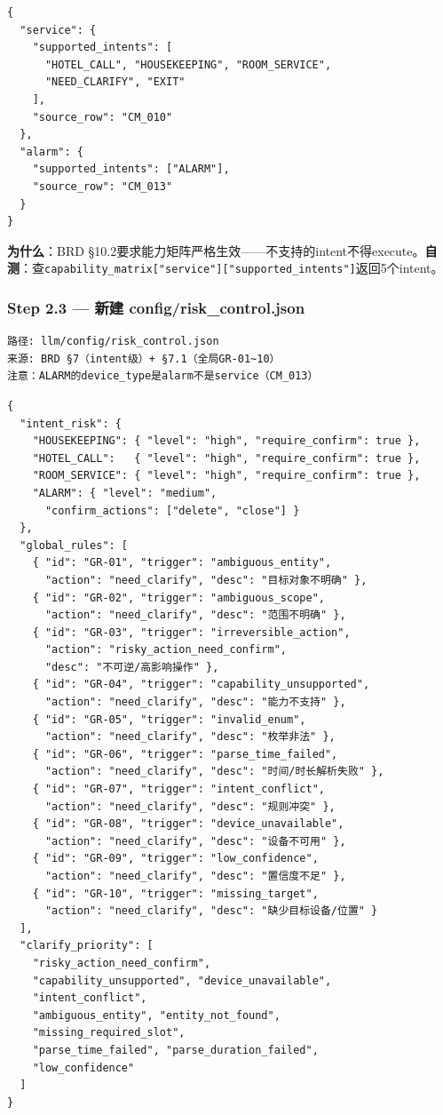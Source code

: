 \documentclass[12pt,a4paper]{ctexart}
\begin{document}
{\small
\begin{verbatim}
{
  "service": {
    "supported_intents": [
      "HOTEL_CALL", "HOUSEKEEPING", "ROOM_SERVICE",
      "NEED_CLARIFY", "EXIT"
    ],
    "source_row": "CM_010"
  },
  "alarm": {
    "supported_intents": ["ALARM"],
    "source_row": "CM_013"
  }
}
\end{verbatim}
}

\textbf{为什么}：BRD §10.2要求能力矩阵严格生效——不支持的intent不得execute。\textbf{自测}：查\texttt{capability\_matrix["service"]["supported\_intents"]}返回5个intent。

\subsubsection*{Step 2.3 — 新建 config/risk\_control.json}
\begin{verbatim}
路径: llm/config/risk_control.json
来源: BRD §7（intent级）+ §7.1（全局GR-01~10）
注意：ALARM的device_type是alarm不是service（CM_013）
\end{verbatim}

{\small
\begin{verbatim}
{
  "intent_risk": {
    "HOUSEKEEPING": { "level": "high", "require_confirm": true },
    "HOTEL_CALL":   { "level": "high", "require_confirm": true },
    "ROOM_SERVICE": { "level": "high", "require_confirm": true },
    "ALARM": { "level": "medium",
      "confirm_actions": ["delete", "close"] }
  },
  "global_rules": [
    { "id": "GR-01", "trigger": "ambiguous_entity",
      "action": "need_clarify", "desc": "目标对象不明确" },
    { "id": "GR-02", "trigger": "ambiguous_scope",
      "action": "need_clarify", "desc": "范围不明确" },
    { "id": "GR-03", "trigger": "irreversible_action",
      "action": "risky_action_need_confirm",
      "desc": "不可逆/高影响操作" },
    { "id": "GR-04", "trigger": "capability_unsupported",
      "action": "need_clarify", "desc": "能力不支持" },
    { "id": "GR-05", "trigger": "invalid_enum",
      "action": "need_clarify", "desc": "枚举非法" },
    { "id": "GR-06", "trigger": "parse_time_failed",
      "action": "need_clarify", "desc": "时间/时长解析失败" },
    { "id": "GR-07", "trigger": "intent_conflict",
      "action": "need_clarify", "desc": "规则冲突" },
    { "id": "GR-08", "trigger": "device_unavailable",
      "action": "need_clarify", "desc": "设备不可用" },
    { "id": "GR-09", "trigger": "low_confidence",
      "action": "need_clarify", "desc": "置信度不足" },
    { "id": "GR-10", "trigger": "missing_target",
      "action": "need_clarify", "desc": "缺少目标设备/位置" }
  ],
  "clarify_priority": [
    "risky_action_need_confirm",
    "capability_unsupported", "device_unavailable",
    "intent_conflict",
    "ambiguous_entity", "entity_not_found",
    "missing_required_slot",
    "parse_time_failed", "parse_duration_failed",
    "low_confidence"
  ]
}
\end{verbatim}
}
\end{document}
